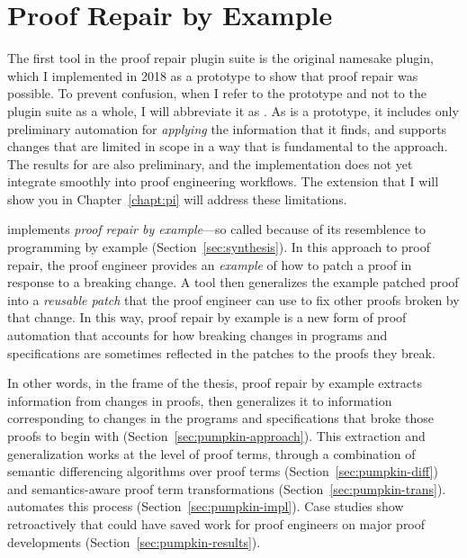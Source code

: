 \chapter{Proof Repair by Example}
\label{ch:example}

The first tool in the \sysnamelong proof repair plugin suite is the original namesake \sysnamelong plugin, which I implemented in 2018 as a prototype to show that proof repair was possible.
To prevent confusion, when I refer to the \sysnamelong prototype and not to the plugin suite as a whole, I will abbreviate it as \sysname.
As \sysname is a prototype, it includes only preliminary automation for \textit{applying} the information that it finds,
and supports changes that are limited in scope in a way that is fundamental to the approach.
The results for \sysname are also preliminary, and the implementation does not yet integrate smoothly into proof engineering workflows.
The \toolnamec extension that I will show you in Chapter~\ref{chapt:pi} will address these limitations.

\sysname implements \textit{proof repair by example}---so called because of its resemblence to programming by example (Section~\ref{sec:synthesis}).
In this approach to proof repair, the proof engineer provides an \textit{example} of how to patch a proof in response to a breaking change.
A tool then generalizes the example patched proof into a \textit{reusable patch} that the proof engineer can use to fix other proofs broken by that change.
In this way, proof repair by example is a new form of proof automation that accounts for how 
breaking changes in programs and specifications are sometimes reflected in the patches to the proofs they break.

In other words, in the frame of the thesis, proof repair by example extracts information from changes in proofs,
then generalizes it to information corresponding to changes in the programs and specifications that broke those proofs to begin with (Section~\ref{sec:pumpkin-approach}).
This extraction and generalization works at the level of proof terms, through a combination of semantic differencing algorithms 
over proof terms (Section~\ref{sec:pumpkin-diff}) and 
semantics-aware proof term transformations (Section~\ref{sec:pumpkin-trans}).
\sysname automates this process (Section~\ref{sec:pumpkin-impl}).
Case studies show retroactively that \sysname could have saved work for proof engineers
on major proof developments (Section~\ref{sec:pumpkin-results}).















